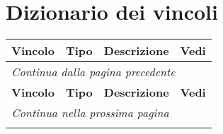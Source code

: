 \section{Dizionario dei vincoli}
\begin{longtable}{|p{}|p{}|p{}|p{}|}
	\hline
	\textbf{Vincolo} & \textbf{Tipo} & \textbf{Descrizione} & \textbf{Vedi} \\
	\hline
	\endfirsthead
	
	\multicolumn{4}{l}{\footnotesize\itshape Continua dalla pagina precedente} \\
	\hline
	\textbf{Vincolo} & \textbf{Tipo} & \textbf{Descrizione} & \textbf{Vedi}  \\
	\hline
	\endhead
	
	\hline
	\multicolumn{3}{r}{\footnotesize\itshape Continua nella prossima pagina} \\
	\endfoot
	

\end{longtable}
